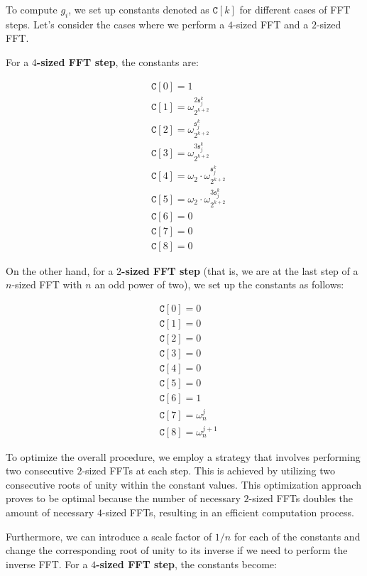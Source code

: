 To compute $g_i$, we set up constants denoted as $\texttt{C}[k]$ for different cases of FFT steps. Let's consider the cases where we perform a $4$-sized FFT and a $2$-sized FFT.

For a \textbf{$4$-sized FFT step}, the constants are:

\begin{align*}
& \texttt{C}[0] = 1 \\
& \texttt{C}[1] = \omega_{2^{k+2}}^{2{\mathfrak{s}_j^k}} \\
& \texttt{C}[2] = \omega_{2^{k+2}}^{{\mathfrak{s}_j^k}} \\
& \texttt{C}[3] = \omega_{2^{k+2}}^{3{\mathfrak{s}_j^k}} \\
& \texttt{C}[4]  = \omega_2 \cdot \omega_{2^{k+2}}^{{\mathfrak{s}_j^k}} \\
& \texttt{C}[5]  = \omega_2 \cdot \omega_{2^{k+2}}^{3{\mathfrak{s}_j^k}} \\
& \texttt{C}[6]  = 0 \\
& \texttt{C}[7]  = 0 \\
& \texttt{C}[8]  = 0 
\end{align*}

On the other hand, for a \textbf{$2$-sized FFT step} (that is, we are at the last step of a $n$-sized FFT with $n$ an odd power of two), we set up the constants as follows:

\begin{align*}
& \texttt{C}[0] = 0 \\
& \texttt{C}[1] = 0 \\
& \texttt{C}[2] = 0 \\
& \texttt{C}[3] = 0 \\
& \texttt{C}[4]  = 0 \\
& \texttt{C}[5]  = 0 \\
& \texttt{C}[6]  = 1\\
& \texttt{C}[7]  = \omega_{n}^j \\
& \texttt{C}[8]  = \omega_{n}^{j+1}
\end{align*}

To optimize the overall procedure, we employ a strategy that involves performing two consecutive $2$-sized FFTs at each step. This is achieved by utilizing two consecutive roots of unity within the constant values. This optimization approach proves to be optimal because the number of necessary $2$-sized FFTs doubles the amount of necessary $4$-sized FFTs, resulting in an efficient computation process.

Furthermore, we can introduce a scale factor of $1/n$ for each of the constants and change the corresponding root of unity to its inverse if we need to perform the inverse FFT. For a \textbf{$4$-sized FFT step}, the constants become:

